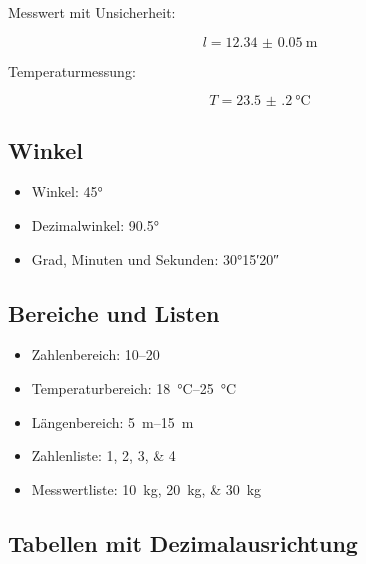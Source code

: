 \documentclass[11pt,a4paper]{scrartcl}
\begin{document}
	Messwert mit Unsicherheit:
	
	\begin{equation}
		l =
		\qty[
		uncertainty-mode=separate
		]{12.34(5)}{\metre}
	\end{equation}
	
	Temperaturmessung:
	
	\begin{equation}
		T =
		\qty[
		uncertainty-mode=separate
		]{23.5(2)}{\celsius}
	\end{equation}
	
	\subsection{Winkel}
	
	\begin{itemize}
		\item Winkel: \ang{45}
		\item Dezimalwinkel: \ang{90.5}
		\item Grad, Minuten und Sekunden:
		\ang{30;15;20}
	\end{itemize}
	
	\subsection{Bereiche und Listen}
	
	\begin{itemize}
		\item Zahlenbereich:
		\numrange{10}{20}
		\item Temperaturbereich:
		\qtyrange{18}{25}{\celsius}
		\item Längenbereich:
		\qtyrange{5}{15}{\metre}
		\item Zahlenliste:
		\numlist{1;2;3;4}
		\item Messwertliste:
		\qtylist{10;20;30}{\kilogram}
	\end{itemize}
	
	\subsection{Tabellen mit Dezimalausrichtung}
	
\end{document}
